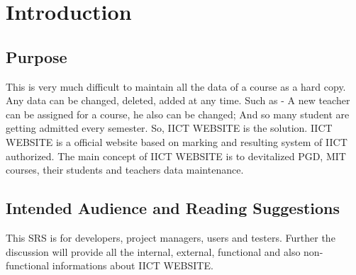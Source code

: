 \documentclass[../main.tex]{subfiles}
\begin{document}
\chapter{Introduction}

\section{Purpose}
This is very much difficult to maintain all the data of a course as a hard copy. Any data can be changed, deleted, added at any time. Such as - A new teacher can be assigned for a course, he also can be changed; And so many student are getting admitted every semester. So, IICT WEBSITE is the solution. IICT WEBSITE is a official website based on marking and resulting system of IICT authorized. The main concept of IICT WEBSITE is to devitalized PGD, MIT courses, their students and teachers data maintenance. 

\section{Intended Audience and Reading Suggestions}
This SRS is for developers, project managers, users and testers. Further the discussion will provide all the internal, external, functional and also non-functional informations about IICT WEBSITE.
\end{document}
